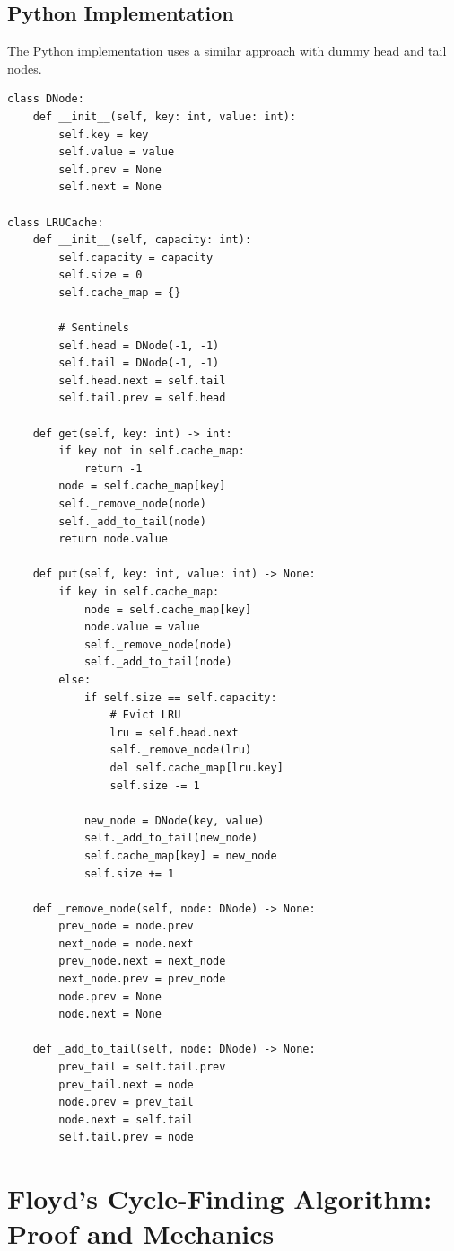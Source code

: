\documentclass[10pt,journal,compsoc,onecolumn]{IEEEtran}
\begin{document}
\subsection{Python Implementation}
The Python implementation uses a similar approach with dummy head and tail nodes.
\begin{verbatim}
class DNode:
    def __init__(self, key: int, value: int):
        self.key = key
        self.value = value
        self.prev = None
        self.next = None

class LRUCache:
    def __init__(self, capacity: int):
        self.capacity = capacity
        self.size = 0
        self.cache_map = {}
        
        # Sentinels
        self.head = DNode(-1, -1)
        self.tail = DNode(-1, -1)
        self.head.next = self.tail
        self.tail.prev = self.head

    def get(self, key: int) -> int:
        if key not in self.cache_map:
            return -1
        node = self.cache_map[key]
        self._remove_node(node)
        self._add_to_tail(node)
        return node.value

    def put(self, key: int, value: int) -> None:
        if key in self.cache_map:
            node = self.cache_map[key]
            node.value = value
            self._remove_node(node)
            self._add_to_tail(node)
        else:
            if self.size == self.capacity:
                # Evict LRU
                lru = self.head.next
                self._remove_node(lru)
                del self.cache_map[lru.key]
                self.size -= 1
            
            new_node = DNode(key, value)
            self._add_to_tail(new_node)
            self.cache_map[key] = new_node
            self.size += 1

    def _remove_node(self, node: DNode) -> None:
        prev_node = node.prev
        next_node = node.next
        prev_node.next = next_node
        next_node.prev = prev_node
        node.prev = None
        node.next = None

    def _add_to_tail(self, node: DNode) -> None:
        prev_tail = self.tail.prev
        prev_tail.next = node
        node.prev = prev_tail
        node.next = self.tail
        self.tail.prev = node
\end{verbatim}

\section{Floyd's Cycle-Finding Algorithm: Proof and Mechanics}
\label{sec:cycle_detection}
\end{document}
